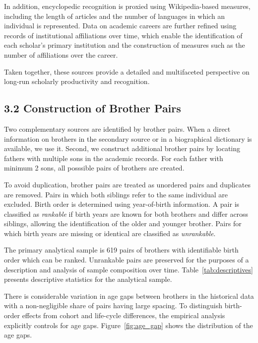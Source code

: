 In addition, encyclopedic recognition is proxied using Wikipedia-based measures, including the length of articles and the number of languages in which an individual is represented. Data on academic careers are further refined using records of institutional affiliations over time, which enable the identification of each scholar’s primary institution and the construction of measures such as the number of affiliations over the career.

Taken together, these sources provide a detailed and multifaceted perspective on long-run scholarly productivity and recognition.

\subsection*{3.2 Construction of Brother Pairs}
 
Two complementary sources are identified by brother pairs. When a direct information on brothers in the secondary source or in a biographical dictionary is available, we use it. Second, we construct additional brother pairs by locating fathers with multiple sons in the academic records. For each father with minimum 2 sons, all posssible pairs of brothers are created.

To avoid duplication, brother pairs are treated as unordered pairs and duplicates are removed. Pairs in which both siblings refer to the same individual are excluded. Birth order is determined using year-of-birth information. A pair is classified as \emph{rankable} if birth years are known for both brothers and differ across siblings, allowing the identification of the older and younger brother. Pairs for which birth years are missing or identical are classified as \emph{unrankable}.

The primary analytical sample is 619 pairs of brothers with identifiable birth order which can be ranked. Unrankable pairs are preserved for the purposes of a description and analysis of sample composition over time. Table~\ref{tab:descriptives} presents descriptive statistics for the analytical sample.

There is considerable variation in age gaps between brothers in the historical data with a non-negligible share of pairs having large spacing. To distinguish birth-order effects from cohort and life-cycle differences, the empirical analysis explicitly controls for age gaps. Figure~\ref{fig:age_gap} shows the distribution of the age gaps.

